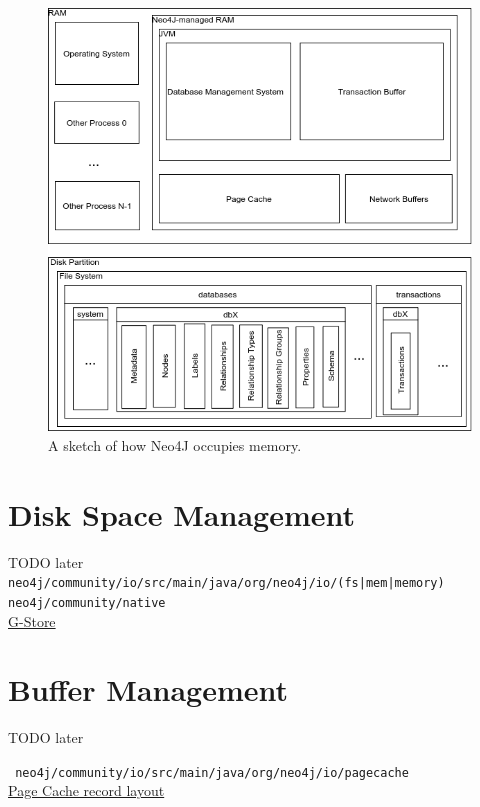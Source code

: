 \documentclass[a4paper,10pt]{article}
\begin{document}
\begin{figure}[htp]\label{N4J_memory_view}
 \begin{center}
  \includegraphics[keepaspectratio,width=\textwidth]{img/intro/N4J_memory_view.png}
 \end{center}
 \caption{A sketch of how Neo4J occupies memory.} %
\end{figure}


\section{Disk Space Management}
TODO later
\texttt{neo4j/community/io/src/main/java/org/neo4j/io/(fs|mem|memory)} \\
\texttt{neo4j/community/native} \\
\href{http://g-store.sourceforge.net/th/index.htm}{G-Store} \\


\section{Buffer Management}
TODO later

\texttt{
neo4j/community/io/src/main/java/org/neo4j/io/pagecache
} \\
\href{https://www.slideshare.net/thobe/an-overview-of-neo4j-internals}{Page Cache record layout} \\
\end{document}
